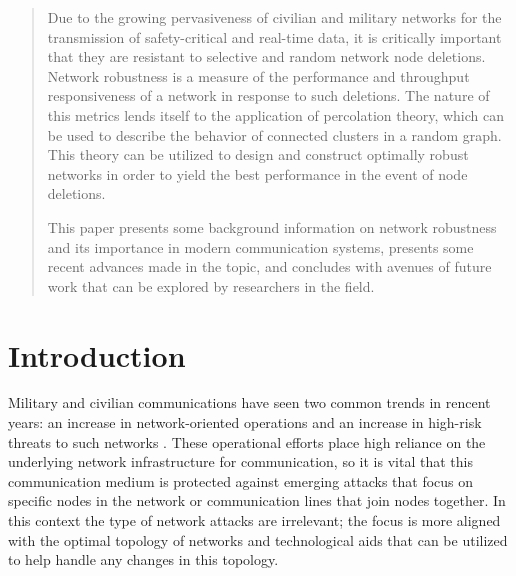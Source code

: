 \documentclass[11pt]{article}
\begin{document}

\begin{abstract}
Due to the growing pervasiveness of civilian and 
military networks for the transmission of safety-critical and real-time data, 
it is critically important that they are resistant to selective and random network 
node deletions. Network robustness is a measure of the performance and 
throughput responsiveness of a network in response to such deletions. The nature of 
this metrics lends itself to the application of percolation theory, which can be
used to describe the behavior of connected clusters in a random graph. This theory
can be utilized to design and construct optimally robust networks in order to yield
the best performance in the event of node deletions.

This paper presents some background information on network robustness and
its importance in modern communication systems, presents some recent advances
made in the topic, and concludes with avenues of future work that can be explored
by researchers in the field. 
\end{abstract}



\section{Introduction}

Military and civilian communications have seen two common trends in rencent years: an 
increase in network-oriented operations and an increase in high-risk threats to
such networks \cite{Bernard_networkrobustness}. These operational efforts place
high reliance on the underlying network infrastructure for communication, so it is vital
that this communication medium is protected against emerging attacks that focus on
specific nodes in the network or communication lines that join nodes together. In this context
the type of network attacks are irrelevant; the focus is more aligned with the optimal topology
of networks and technological aids that can be utilized to help handle any changes in this topology. 
\end{document}
